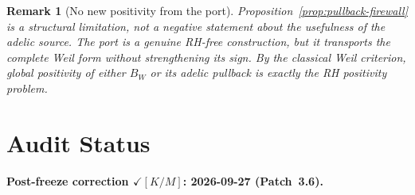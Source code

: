 \documentclass[11pt,a4paper]{amsart}
\newtheorem{remark}[theorem]{Remark}
\begin{document}
\begin{remark}[No new positivity from the port]
Proposition~\ref{prop:pullback-firewall} is a structural limitation, not a
negative statement about the usefulness of the adelic source. The port is a
genuine RH-free construction, but it transports the complete Weil form without
strengthening its sign. By the classical Weil criterion, global positivity of
either $B_W$ or its adelic pullback is exactly the RH positivity problem.
\end{remark}

\section{Audit Status}

\textbf{Post-freeze correction $\checkmark[K/M]$: 2026-09-27 (Patch~3.6).}
\end{document}
